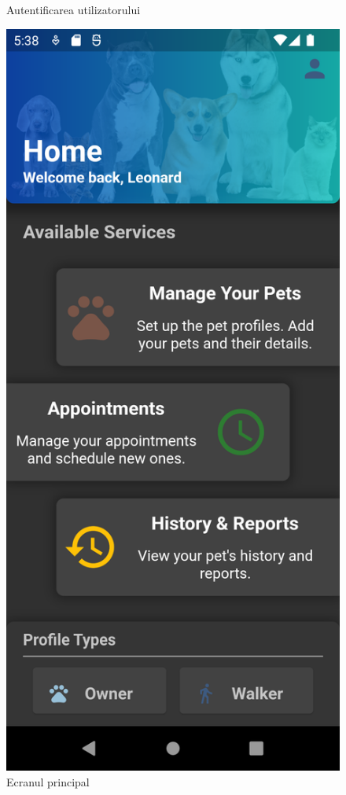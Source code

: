 \begin{figure}[!htb]
      \caption{Autentificarea utilizatorului}\label{fig:login}
    \endminipage\hfill
      \includegraphics[width=\linewidth]{images/screenshots/main_screen.png}
      \caption{Ecranul principal}\label{fig:main_screen}
    \endminipage

\end{figure}

